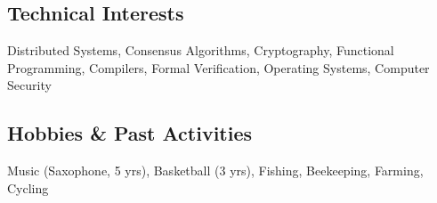 \documentclass[a4paper,12pt]{article}
\begin{document}
\vspace*{3pt}
\subsection{Technical Interests}
Distributed Systems, Consensus Algorithms, Cryptography, Functional Programming, Compilers, Formal Verification, Operating Systems, Computer Security

\vspace*{3pt}
\subsection{Hobbies \& Past Activities}
Music (Saxophone, 5 yrs), Basketball (3 yrs), Fishing, Beekeeping, Farming, Cycling
\end{document}
